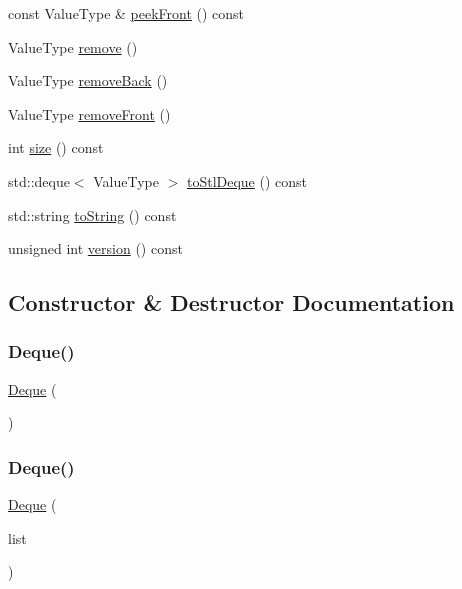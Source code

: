 \begin{DoxyCompactItemize}
\item 
const Value\+Type \& \mbox{\hyperlink{classDeque_a7bac5f26f5665291d89e8de29496ee79}{peek\+Front}} () const
\item 
Value\+Type \mbox{\hyperlink{classDeque_a025ec97fa5b04552f5ad0902c1f02ac1}{remove}} ()
\item 
Value\+Type \mbox{\hyperlink{classDeque_af7878e9c2f67e06cbae525e9fa77e38e}{remove\+Back}} ()
\item 
Value\+Type \mbox{\hyperlink{classDeque_a02453aa96e93c38ca4c1d176307c8a63}{remove\+Front}} ()
\item 
int \mbox{\hyperlink{classDeque_af9593d4a5ff4274efaf429cb4f9e57cc}{size}} () const
\item 
std\+::deque$<$ Value\+Type $>$ \mbox{\hyperlink{classDeque_a577546d159bb5d7237f506789f2beafd}{to\+Stl\+Deque}} () const
\item 
std\+::string \mbox{\hyperlink{classDeque_a1fe5121d6528fdea3f243321b3fa3a49}{to\+String}} () const
\item 
unsigned int \mbox{\hyperlink{classDeque_a0aa696ccb72cbf928535d6b646bac1aa}{version}} () const
\end{DoxyCompactItemize}


\subsection{Constructor \& Destructor Documentation}
\mbox{\label{classDeque_a41ebad440badfe713f3ffbbec2eac93f}} 
\subsubsection{\texorpdfstring{Deque()}{Deque()}\hspace{0.1cm}{\footnotesize\ttfamily [1/2]}}
{\footnotesize\ttfamily \mbox{\hyperlink{classDeque}{Deque}} (\begin{DoxyParamCaption}{ }\end{DoxyParamCaption})}

\mbox{\label{classDeque_a68fd6ae6ef9283c882d90c6924e932cd}} 
\subsubsection{\texorpdfstring{Deque()}{Deque()}\hspace{0.1cm}{\footnotesize\ttfamily [2/2]}}
{\footnotesize\ttfamily \mbox{\hyperlink{classDeque}{Deque}} (\begin{DoxyParamCaption}\item[{std\+::initializer\+\_\+list$<$ Value\+Type $>$}]{list }\end{DoxyParamCaption})}


